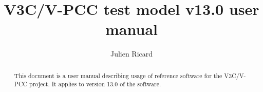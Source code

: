 \documentclass[a4paper,11pt]{mpegdoc}
\title{V3C/V-PCC test model v13.0 user manual}
\author{%
	Julien Ricard
	\email{julien.ricard@interdigital.com}
}
\begin{document}
\maketitle
\begin{abstract}
This document is a user manual describing usage of reference software
for the V3C/V-PCC project. It applies to version 13.0 of the software.
\end{abstract}

\tableofcontents








%
\end{document}
